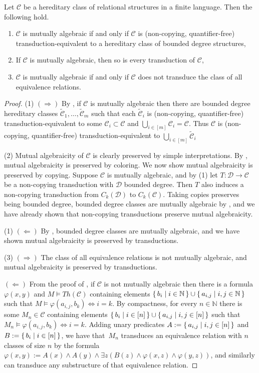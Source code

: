 \documentclass{lmcs}
\newcommand{\tCC}{\widetilde{\Cc}}
\newcommand{\Ra}{\Rightarrow}
\newcommand{\La}{\Leftarrow}
\newcommand{\Cc}{\mathscr{C}}
\newcommand{\Dd}{\mathscr{D}}
\newcommand{\N}{\mathbb{N}}
\renewcommand{\phi}{\varphi}
\theoremstyle{definition}
\begin{document}
\begin{prop} \label{p:MA}
	Let $\Cc$ be a hereditary class of relational structures in a finite language. Then the following hold.
	\begin{enumerate}
		\item $\Cc$ is mutually algebraic if and only if $\Cc$ is (non-copying, quantifier-free) transduction-equivalent to a hereditary class of bounded degree structures,
		\item If $\Cc$ is mutually algebraic, then so is every transduction of $\Cc$,
		\item $\Cc$ is mutually algebraic if and only if $\Cc$ does not transduce the class of all equivalence relations.
	\end{enumerate}
\end{prop}
\begin{proof}
	(1) $(\Ra)$ By \cite[Proposition 4.12]{LT2}, if $\Cc$ is mutually algebraic then there are bounded degree hereditary classes $\tCC_1, \dots, \tCC_m$ such that each $\tCC_i$ is (non-copying, quantifier-free) transduction-equivalent to some $\Cc_i \subset \Cc$ and $\bigcup_{i \in [m]} \Cc_i = \Cc$. Thus $\Cc$ is (non-copying, quantifier-free) transduction-equivalent to $\bigcup_{i \in [m]} \tCC_i$	
	
	(2) Mutual algebraicity of $\Cc$ is clearly preserved by simple interpretations. By \cite[Theorem 3.3]{MA}, mutual algebraicity is preserved by coloring. We now show mutual algebraicity is preserved by copying. Suppose $\Cc$ is mutually algebraic, and by (1) let $T \colon \Dd \to \Cc$ be a non-copying transduction with $\Dd$ bounded degree. Then $T$ also induces a non-copying transduction from $C_k(\Dd)$ to $C_k(\Cc)$.  Taking copies preserves being bounded degree, bounded degree classes are mutually algebraic by \cite[Lemma 4.3]{LT2}, and we have already shown that non-copying transductions preserve mutual algebraicity.
	
	(1) $(\La)$ By \cite[Lemma 4.3]{LT2}, bounded degree classes are mutually algebraic, and we have shown mutual algebraicity is preserved by transductions.
	
	(3) $(\Ra)$ The class of all equivalence relations is not mutually algebraic, and mutual algebraicity is preserved by transductions.
	
	$(\La)$ From the proof of \cite[Theorem 3.2(4)]{Worst}, if $\Cc$ is not mutually algebraic then there is a formula $\phi(x,y)$ and $M \models Th(\Cc)$ containing elements $\set{b_i | i \in \N} \cup \set{a_{i,j} | i,j \in \N}$ such that $M \models \phi(a_{i,j}, b_k) \iff i = k$. By compactness, for every $n \in \N$ there is some $M_n \in \Cc$ containing elements $\set{b_i | i \in [n]} \cup \set{a_{i,j} | i,j \in [n]}$ such that $M_n \models \phi(a_{i,j}, b_k) \iff i = k$. Adding unary predicates $A  := \set{a_{i,j} | i,j \in [n]}$ and $B := \set{b_i | i \in [n]}$, we have that~$M_n$ transduces an equivalence relation with $n$ classes of size $n$ by the formula $\phi(x,y) := A(x) \wedge A(y) \wedge \exists z(B(z) \wedge \phi(x, z) \wedge \phi(y, z))$, and similarly can transduce any substructure of that equivalence relation.
\end{proof}
\end{document}
